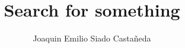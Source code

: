 \documentclass[print]{nuthesis}
\begin{document}

\renewcommand\bibname{References}
\frontmatter

\title{Search for something}
\author{Joaquin Emilio Siado Casta{\~n}eda}

\maketitle
\begin{abstract}
 
\end{abstract}


\begin{dedication}
\end{dedication}

\begin{acknowledgments}

%

\end{acknowledgments}
\end{document}
